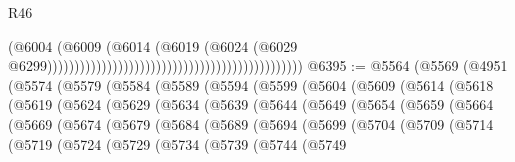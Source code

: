 \begin{lexlean}{R46}
\begin{coremodule}
                                                                                      (@6004
                                                                                        (@6009
                                                                                          (@6014
                                                                                            (@6019
                                                                                              (@6024
                                                                                                (@6029
                                                                                                  @6299)))))))))))))))))))))))))))))))))))))))))))))))
@6395 := @5564
    (@5569
      (@4951
        (@5574
          (@5579
            (@5584
              (@5589
                (@5594
                  (@5599
                    (@5604
                      (@5609
                        (@5614
                          (@5618
                            (@5619
                              (@5624
                                (@5629
                                  (@5634
                                    (@5639
                                      (@5644
                                        (@5649
                                          (@5654
                                            (@5659
                                              (@5664
                                                (@5669
                                                  (@5674
                                                    (@5679
                                                      (@5684
                                                        (@5689
                                                          (@5694
                                                            (@5699
                                                              (@5704
                                                                (@5709
                                                                  (@5714
                                                                    (@5719
                                                                      (@5724
                                                                        (@5729
                                                                          (@5734
                                                                            (@5739
                                                                              (@5744
                                                                                (@5749

\end{coremodule}
\end{lexlean}
